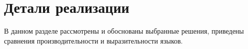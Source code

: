 \section{Детали реализации}
В данном разделе рассмотрены и обоснованы выбранные решения, приведены сравнения производительности и выразительности языков.



